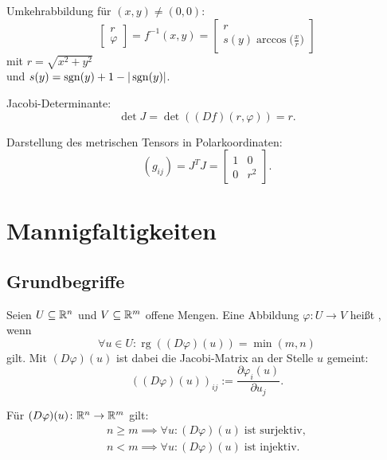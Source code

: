 Umkehrabbildung für $(x,y)\ne (0,0)$:
\begin{equation}
\begin{bmatrix}r\\ \varphi\end{bmatrix}
= f^{-1}(x,y)
= \begin{bmatrix}
r\\
\displaystyle s(y)\arccos\Big(\frac{x}{r}\Big)
\end{bmatrix}
\end{equation}
mit $r=\sqrt{x^2+y^2}$\\
und $s(y)=\operatorname*{sgn}(y)+1-|\operatorname*{sgn}(y)|$.

Jacobi-Determinante:
\begin{equation}
\det J = \det((Df)(r,\varphi)) =r.
\end{equation}

\pagebreak[3]\noindent
Darstellung des metrischen Tensors in Polarkoordinaten:%
\begin{equation}
(g_{ij}) = J^T J = \begin{bmatrix}
1 & 0\\
0 & r^2
\end{bmatrix}.
\end{equation}

\section{Mannigfaltigkeiten}
\subsection{Grundbegriffe}

\begin{definition}\mbox{}\newline
Seien $U\subseteq\mathbb R^n$ und $V\subseteq\mathbb R^m$ offene Mengen.
Eine Abbildung $\varphi\colon U\to V$
heißt , wenn%
\begin{equation}
\forall u\in U\colon \operatorname{rg}((D\varphi)(u))=\min(m,n)
\end{equation}
gilt. Mit $(D\varphi)(u)$ ist dabei die Jacobi-Matrix an der Stelle
$u$ gemeint:
\begin{equation}
((D\varphi)(u))_{ij} := \frac{\partial\varphi_i(u)}{\partial u_j}.
\end{equation}
\end{definition}
\noindent
Für $(D\varphi)(u)\colon\mathbb R^n\to\mathbb R^m$ gilt:
\begin{gather}
n{\ge}m\implies\forall u\colon (D\varphi)(u)\;\text{ist surjektiv},\\
n{<}m\implies\forall u\colon (D\varphi)(u)\;\text{ist injektiv}.
\end{gather}

